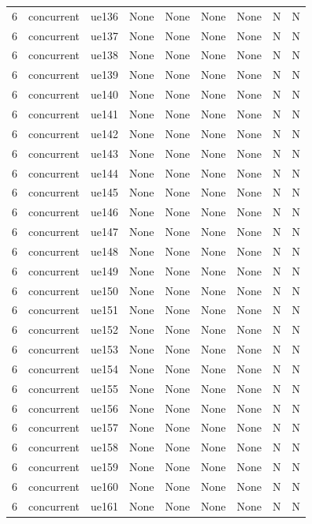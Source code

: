\begin{table}[ht]
\begin{tabular}{|c|c|c|c|c|c|c|c|c|}
6 & concurrent & ue136 & None & None & None & None & N & N \\
6 & concurrent & ue137 & None & None & None & None & N & N \\
6 & concurrent & ue138 & None & None & None & None & N & N \\
6 & concurrent & ue139 & None & None & None & None & N & N \\
6 & concurrent & ue140 & None & None & None & None & N & N \\
6 & concurrent & ue141 & None & None & None & None & N & N \\
6 & concurrent & ue142 & None & None & None & None & N & N \\
6 & concurrent & ue143 & None & None & None & None & N & N \\
6 & concurrent & ue144 & None & None & None & None & N & N \\
6 & concurrent & ue145 & None & None & None & None & N & N \\
6 & concurrent & ue146 & None & None & None & None & N & N \\
6 & concurrent & ue147 & None & None & None & None & N & N \\
6 & concurrent & ue148 & None & None & None & None & N & N \\
6 & concurrent & ue149 & None & None & None & None & N & N \\
6 & concurrent & ue150 & None & None & None & None & N & N \\
6 & concurrent & ue151 & None & None & None & None & N & N \\
6 & concurrent & ue152 & None & None & None & None & N & N \\
6 & concurrent & ue153 & None & None & None & None & N & N \\
6 & concurrent & ue154 & None & None & None & None & N & N \\
6 & concurrent & ue155 & None & None & None & None & N & N \\
6 & concurrent & ue156 & None & None & None & None & N & N \\
6 & concurrent & ue157 & None & None & None & None & N & N \\
6 & concurrent & ue158 & None & None & None & None & N & N \\
6 & concurrent & ue159 & None & None & None & None & N & N \\
6 & concurrent & ue160 & None & None & None & None & N & N \\
6 & concurrent & ue161 & None & None & None & None & N & N \\

\end{tabular}
\end{table}
